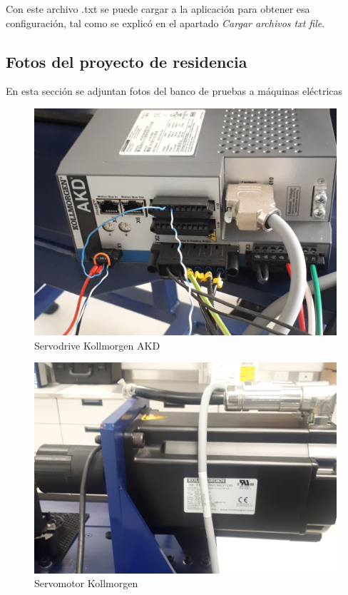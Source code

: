 \documentclass[12pt,titlepage]{article}
\begin{document}
Con este archivo .txt se puede cargar a la aplicación para obtener esa configuración, tal como se explicó en el apartado \textit{Cargar archivos txt file}.

\newpage

\subsection{Fotos del proyecto de residencia}
En esta sección se adjuntan fotos del banco de pruebas a máquinas eléctricas

\begin{figure}[H]
\hspace*{2.8cm} 
\includegraphics[scale=0.075]{servodrive}
\caption{Servodrive Kollmorgen AKD}
\end{figure}

\begin{figure}[H]
\hspace*{2.8cm} 
\includegraphics[scale=0.12]{servo_lab}
\caption{Servomotor Kollmorgen}
\end{figure}
\newpage
\end{document}
